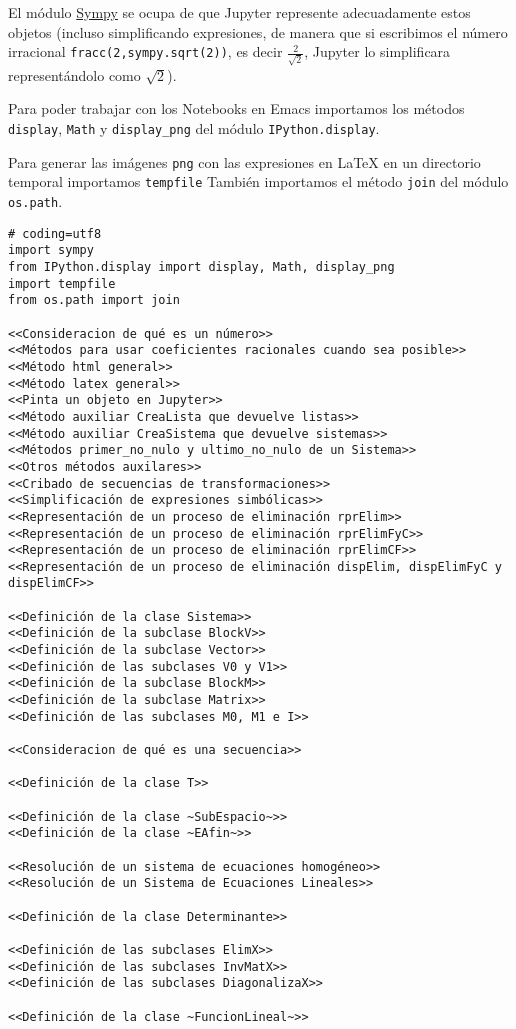 \documentclass[11pt]{report}
\begin{document}
El módulo \href{https://www.sympy.org/en/index.html}{Sympy} se ocupa de que Jupyter represente adecuadamente estos
objetos (incluso simplificando expresiones, de manera que si
escribimos el número irracional \texttt{fracc(2,sympy.sqrt(2))}, es decir
\(\frac{2}{\sqrt{2}}\), Jupyter lo simplificara representándolo como
\(\sqrt{2}\)).

Para poder trabajar con los Notebooks en Emacs importamos los métodos
\texttt{display}, \texttt{Math} y \texttt{display\_png} del módulo \texttt{IPython.display}.

Para generar las imágenes \texttt{png} con las expresiones en \LaTeX{} en un
directorio temporal importamos \texttt{tempfile}
También importamos el método \texttt{join} del módulo \texttt{os.path}.
\begin{verbatim}
# coding=utf8
import sympy
from IPython.display import display, Math, display_png
import tempfile
from os.path import join           

<<Consideracion de qué es un número>>
<<Métodos para usar coeficientes racionales cuando sea posible>>
<<Método html general>>
<<Método latex general>>
<<Pinta un objeto en Jupyter>>
<<Método auxiliar CreaLista que devuelve listas>>
<<Método auxiliar CreaSistema que devuelve sistemas>>
<<Métodos primer_no_nulo y ultimo_no_nulo de un Sistema>>
<<Otros métodos auxilares>>
<<Cribado de secuencias de transformaciones>>
<<Simplificación de expresiones simbólicas>>
<<Representación de un proceso de eliminación rprElim>>
<<Representación de un proceso de eliminación rprElimFyC>>
<<Representación de un proceso de eliminación rprElimCF>>
<<Representación de un proceso de eliminación dispElim, dispElimFyC y dispElimCF>>

<<Definición de la clase Sistema>>
<<Definición de la subclase BlockV>>
<<Definición de la subclase Vector>>
<<Definición de las subclases V0 y V1>>
<<Definición de la subclase BlockM>>
<<Definición de la subclase Matrix>>
<<Definición de las subclases M0, M1 e I>>

<<Consideracion de qué es una secuencia>>

<<Definición de la clase T>>

<<Definición de la clase ~SubEspacio~>>
<<Definición de la clase ~EAfin~>>

<<Resolución de un sistema de ecuaciones homogéneo>>
<<Resolución de un Sistema de Ecuaciones Lineales>>

<<Definición de la clase Determinante>>

<<Definición de las subclases ElimX>>
<<Definición de las subclases InvMatX>>
<<Definición de las subclases DiagonalizaX>>

<<Definición de la clase ~FuncionLineal~>>
\end{verbatim}
\end{document}
